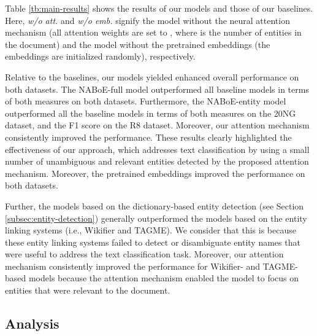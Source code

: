 \documentclass[11pt,a4paper]{article}
\begin{document}
    Table \ref{tb:main-results} shows the results of our models and those of our baselines.
    Here, \textit{w/o att.} and \textit{w/o emb.} signify the model without the neural attention mechanism (all attention weights  are set to , where  is the number of entities in the document) and the model without the pretrained embeddings (the embeddings are initialized randomly), respectively.

    Relative to the baselines, our models yielded enhanced overall performance on both datasets.
    The NABoE-full model outperformed all baseline models in terms of both measures on both datasets.
    Furthermore, the NABoE-entity model outperformed all the baseline models in terms of both measures on the 20NG dataset, and the F1 score on the R8 dataset.
    Moreover, our attention mechanism consistently improved the performance.
    These results clearly highlighted the effectiveness of our approach, which addresses text classification by using a small number of unambiguous and relevant entities detected by the proposed attention mechanism.
    Moreover, the pretrained embeddings improved the performance on both datasets.

    Further, the models based on the dictionary-based entity detection (see Section \ref{subsec:entity-detection}) generally outperformed the models based on the entity linking systems (i.e., Wikifier and TAGME).
    We consider that this is because these entity linking systems failed to detect or disambiguate entity names that were useful to address the text classification task.
    Moreover, our attention mechanism consistently improved the performance for Wikifier- and TAGME-based models because the attention mechanism enabled the model to focus on entities that were relevant to the document.

    \subsection{Analysis}
\end{document}
